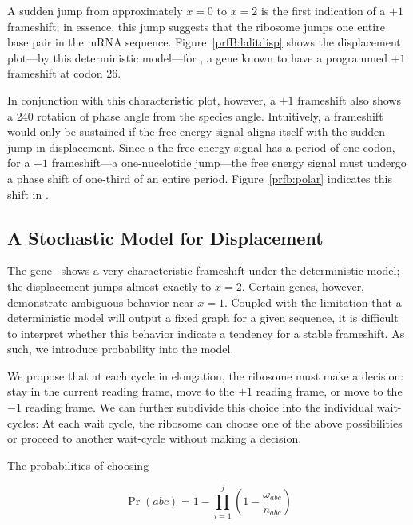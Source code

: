 \documentclass[12pt]{article}
\begin{document}

A sudden jump from approximately $x = 0$ to $x = 2$ is the first indication of a $+1$ frameshift; 
in essence, this jump suggests that the ribosome jumps one entire base pair in the mRNA sequence.
Figure~\ref{prfB:lalitdisp} shows the displacement plot---by this deterministic model---for \prfB, 
a gene known to have a programmed $+1$ frameshift at codon 26.

In conjunction with this characteristic plot, however, a $+1$ frameshift also shows a 240\degree
rotation of phase angle from the species angle.
Intuitively, a frameshift would only be sustained if the free energy signal aligns itself with the sudden jump in displacement.
Since a the free energy signal has a period of one codon, for a $+1$ frameshift---a one-nucelotide jump---the free energy signal
must undergo a phase shift of one-third of an entire period.  Figure~\ref{prfb:polar} indicates this shift in \prfB.

\subsection{A Stochastic Model for Displacement}


The gene \prfB\ shows a very characteristic frameshift under the deterministic model; the displacement jumps almost exactly to $x=2$.
Certain genes, however, demonstrate ambiguous behavior near $x = 1$.
Coupled with the limitation that a deterministic model will output a fixed graph for a given sequence, 
it is difficult to interpret whether this behavior indicate a tendency for a stable frameshift.
As such, we introduce probability into the model.

We propose that at each cycle in elongation, the ribosome must make a decision: stay in the current reading frame, move to the $+1$ reading frame,
or move to the $-1$ reading frame.  We can further subdivide this choice into the individual wait-cycles: 
At each wait cycle, the ribosome can choose one of the above possibilities or proceed to another wait-cycle without making a decision.

The probabilities of choosing

$$\Pr\left(abc\right) = 1 - \prod_{i=1}^j \left(1-\frac{\omega_{abc}}{n_{abc}}\right)$$
\end{document}

